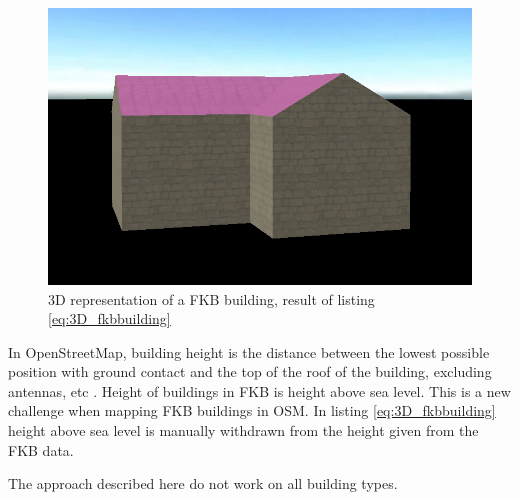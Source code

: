 \begin{figure}[H]
    \centering
    \includegraphics[scale=0.5]{figures/FixedByMe/3DFKBbuilding.png}
    \caption{3D representation of a FKB building, result of listing \ref{eq:3D_fkbbuilding}}
    \label{fig:3DFKBbuild}
\end{figure}

In OpenStreetMap, building height is the distance between the lowest possible position with ground contact and the top of the roof of the building, excluding antennas, etc \cite{OSMwikipage2016}. Height of buildings in FKB is height above sea level. This is a new challenge when mapping FKB buildings in OSM. In listing \ref{eq:3D_fkbbuilding} height above sea level is manually withdrawn from the height given from the FKB data. 

The approach described here do not work on all building types. 



